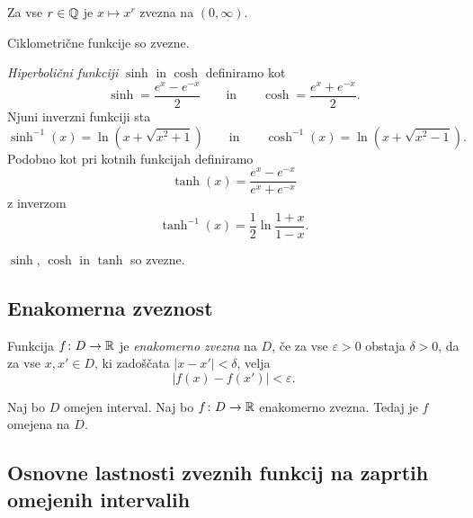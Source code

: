 \documentclass[12pt, a4paper]{article}
\begin{document}
\begin{posledica}
Za vse $r\in\mathbb{Q}$ je $x\mapsto x^r$ zvezna na $(0,\infty)$.
\end{posledica}

\begin{posledica}
Ciklometrične funkcije so zvezne.
\end{posledica}

\begin{definicija}
\emph{Hiperbolični funkciji} $\sinh$ in $\cosh$ definiramo kot
\[
\sinh=\frac{e^x-e^{-x}}{2}\qquad\text{in}\qquad\cosh=\frac{e^x+e^{-x}}{2}.
\]
Njuni inverzni funkciji sta
\[
\sinh^{-1}(x)=\ln(x+\sqrt{x^2+1})\qquad\text{in}\qquad\cosh^{-1}(x)=\ln(x+\sqrt{x^2-1}).
\]
Podobno kot pri kotnih funkcijah definiramo
\[
\tanh(x)=\frac{e^x-e^{-x}}{e^x+e^{-x}}
\]
z inverzom
\[
\tanh^{-1}(x)=\frac{1}{2}\ln\frac{1+x}{1-x}.
\]
\end{definicija}

\begin{posledica}
$\sinh$, $\cosh$ in $\tanh$ so zvezne.
\end{posledica}

\newpage

\subsection{Enakomerna zveznost}

\begin{okvir}
\begin{definicija}
Funkcija $f\colon D\to\mathbb{R}$ je \emph{enakomerno zvezna} na $D$, če za vse $\varepsilon>0$ obstaja $\delta>0$, da za vse $x,x'\in D$, ki zadoščata $|x-x'|<\delta$, velja
\[
|f(x)-f(x')|<\varepsilon.
\]
\end{definicija}
\end{okvir}

\begin{trditev}
Naj bo $D$ omejen interval. Naj bo $f\colon D\to\mathbb{R}$ enakomerno zvezna. Tedaj je $f$ omejena na $D$.
\end{trditev}

\obvs

\newpage

\subsection{Osnovne lastnosti zveznih funkcij na zaprtih omejenih intervalih}
\end{document}
